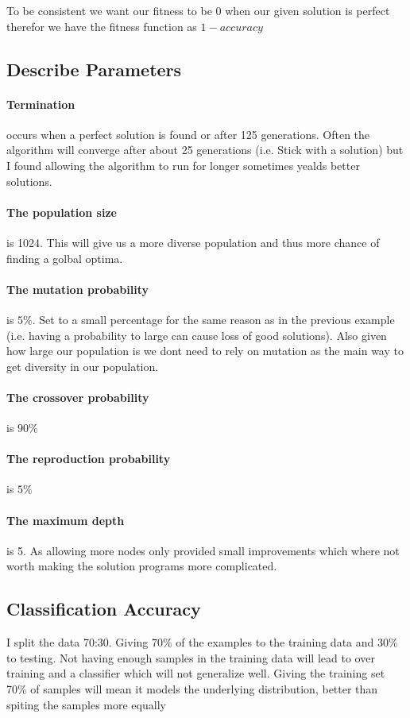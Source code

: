 \documentclass[a4paper, 12pt]{article}
\begin{document}
			To be consistent we want our fitness to be 0 when our given solution is perfect therefor we have the fitness function as $1 - accuracy$
		
		\subsection{Describe Parameters}
			\paragraph{Termination} occurs when a perfect solution is found or after 125 generations. Often the algorithm will converge after about 25 generations (i.e. Stick with a solution) but I found allowing the algorithm to run for longer sometimes yealds better solutions.
			
			\paragraph{The population size} is 1024. This will give us a more diverse population and thus more chance of finding a golbal optima.			
			
			\paragraph{The mutation probability} is $5\%$. Set to a small percentage for the same reason as in the previous example (i.e. having a probability to large can cause loss of good solutions). Also given how large our population is we dont need to rely on mutation as the main way to get diversity in our population.

			\paragraph{The crossover probability} is $90\%$
			
			\paragraph{The reproduction probability} is  $5\%$
			
			\paragraph{The maximum depth} is 5.  As allowing more nodes only provided small improvements which where not worth making the solution programs more complicated.
		
		\subsection{Classification Accuracy}
			I split the data 70:30. Giving 70\% of the examples to the training data and 30\% to testing. Not having enough samples in the training data will lead to over training and a classifier which will not generalize well. Giving the training set 70\% of samples will mean it models the underlying distribution, better than spiting the samples more equally
		
\end{document}
